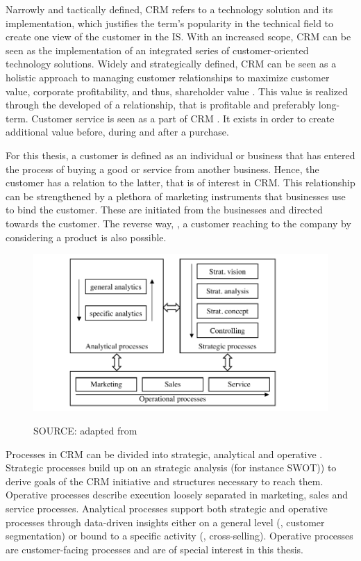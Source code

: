 		Narrowly and tactically defined, \acrshort{CRM} refers to a technology solution and its implementation, which justifies the term's popularity in the technical field to create one view of the customer in the \acrshort{IS}. With an increased scope, \acrshort{CRM} can be seen as the implementation of an integrated series of customer-oriented technology solutions. Widely and strategically defined, \acrshort{CRM} can be seen as a holistic approach to managing customer relationships to maximize customer value, corporate profitability, and thus, shareholder value \citep{payne2004role}. This value is realized through the developed of a relationship, that is profitable and preferably long-term.  Customer service is seen as a part of \acrshort{CRM} \citep[]{Helmke_2012}. It exists in order to create additional value before, during and after a purchase. 
	
		For this thesis, a customer is defined as an individual or business that has entered the process of buying a good or service from another business. Hence, the customer has a relation to the latter, that is of interest in CRM. This relationship can be strengthened by a plethora of marketing instruments that businesses use to bind the customer. These are initiated from the businesses and directed towards the customer. The reverse way, \ie, a customer reaching to the company by considering a product is also possible. 
		
			\begin{figure}[caption={CRM processes}, label={fig:crmprocessfr}]
			{	\includegraphics[width=.8\textwidth]{figures/crmprocessfr.pdf}
				
		\hspace{5.9cm}	SOURCE: adapted from \citep[]{Helmke_2012}
				
			 }
		\end{figure}
	
		
		Processes in CRM can be divided into strategic, analytical and operative \citep{Neckel2005}. Strategic processes build up on an strategic analysis (for instance \acrfull{SWOT})) to derive goals of the CRM initiative and structures necessary to reach them. Operative processes describe execution loosely separated in marketing, sales and service processes. Analytical processes support both strategic and operative processes through data-driven insights either on a general level (\ie, customer segmentation) or bound to a specific activity (\ie, cross-selling). Operative processes are customer-facing processes and are of special interest in this thesis. 
		
